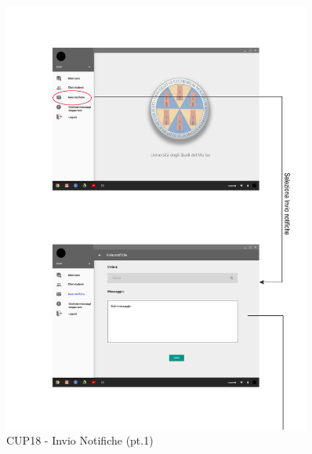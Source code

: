 \begin{figure}
	\centering
	\includegraphics[width=0.9\textwidth]{imgs/gruppo6/activities/act_cup18_invio_notifiche1.pdf}
	\caption{CUP18 - Invio Notifiche (pt.1)}
	\label{fig:cup18}
\end{figure}


